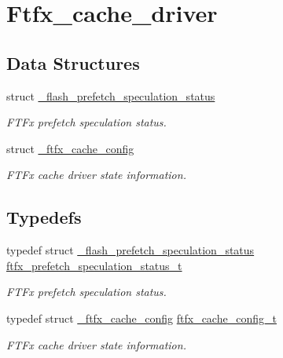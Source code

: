\hypertarget{group__ftfx__cache__driver}{}\section{Ftfx\+\_\+cache\+\_\+driver}
\label{group__ftfx__cache__driver}
\subsection*{Data Structures}
\begin{DoxyCompactItemize}
\item 
struct \mbox{\hyperlink{struct__flash__prefetch__speculation__status}{\+\_\+flash\+\_\+prefetch\+\_\+speculation\+\_\+status}}
\begin{DoxyCompactList}\small\item\em F\+T\+Fx prefetch speculation status. \end{DoxyCompactList}\item 
struct \mbox{\hyperlink{struct__ftfx__cache__config}{\+\_\+ftfx\+\_\+cache\+\_\+config}}
\begin{DoxyCompactList}\small\item\em F\+T\+Fx cache driver state information. \end{DoxyCompactList}\end{DoxyCompactItemize}
\subsection*{Typedefs}
\begin{DoxyCompactItemize}
\item 
\mbox{\label{group__ftfx__cache__driver_ga4ee23b743843fdca0f97dfbb91c105b7}} 
typedef struct \mbox{\hyperlink{struct__flash__prefetch__speculation__status}{\+\_\+flash\+\_\+prefetch\+\_\+speculation\+\_\+status}} \mbox{\hyperlink{group__ftfx__cache__driver_ga4ee23b743843fdca0f97dfbb91c105b7}{ftfx\+\_\+prefetch\+\_\+speculation\+\_\+status\+\_\+t}}
\begin{DoxyCompactList}\small\item\em F\+T\+Fx prefetch speculation status. \end{DoxyCompactList}\item 
typedef struct \mbox{\hyperlink{struct__ftfx__cache__config}{\+\_\+ftfx\+\_\+cache\+\_\+config}} \mbox{\hyperlink{group__ftfx__cache__driver_ga8ddae8f98cec13ff7c33bc515d01c487}{ftfx\+\_\+cache\+\_\+config\+\_\+t}}
\begin{DoxyCompactList}\small\item\em F\+T\+Fx cache driver state information. \end{DoxyCompactList}\end{DoxyCompactItemize}
